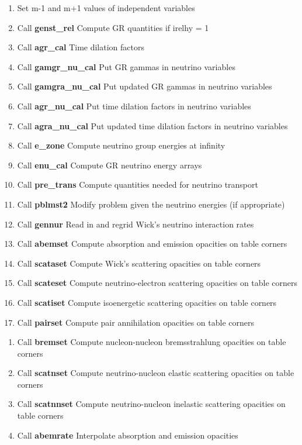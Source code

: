 \documentclass[11pt,doublespace]{article}
\begin{document}
\begin{itemize}
\begin{enumerate}
\begin{enumerate}
\begin{enumerate}
\begin{enumerate}
  \item Set m-1 and m+1 values of independent variables
  \item Call {\bf genst\_rel} Compute GR quantities if irelhy = 1
  \item Call {\bf agr\_cal} Time dilation factors
  \item Call {\bf gamgr\_nu\_cal} Put GR gammas in neutrino variables
  \item Call {\bf gamgra\_nu\_cal} Put updated GR gammas in neutrino variables
  \item Call {\bf agr\_nu\_cal} Put time dilation factors in neutrino variables
  \item Call {\bf agra\_nu\_cal} Put updated time dilation factors in neutrino variables
  \item Call {\bf e\_zone} Compute neutrino group energies at infinity
  \item Call {\bf enu\_cal} Compute GR neutrino energy arrays
  \item Call {\bf pre\_trans} Compute quantities needed for neutrino transport
  \item Call {\bf pblmst2} Modify problem given the neutrino energies (if appropriate)
  \item Call {\bf gennur} Read in and regrid Wick's neutrino interaction rates
  \item Call {\bf abemset} Compute absorption and emission opacities on table corners
  \item Call {\bf scataset} Compute Wick's scattering opacities on table corners
  \item Call {\bf scateset} Compute neutrino-electron scattering opacities on table corners
  \item Call {\bf scatiset} Compute isoenergetic scattering opacities on table corners
  \item Call {\bf pairset} Compute pair annihilation opacities on table corners
\end{enumerate}
\begin{enumerate}
  \item Call {\bf bremset} Compute nucleon-nucleon bremsstrahlung opacities on table corners
  \item Call {\bf scatnset} Compute neutrino-nucleon elastic scattering opacities on table corners
  \item Call {\bf scatnnset} Compute neutrino-nucleon inelastic scattering opacities on table corners
  \item Call {\bf abemrate} Interpolate absorption and emission opacities

\end{enumerate}
\end{enumerate}
\end{enumerate}
\end{enumerate}
\end{itemize}
\end{document}
